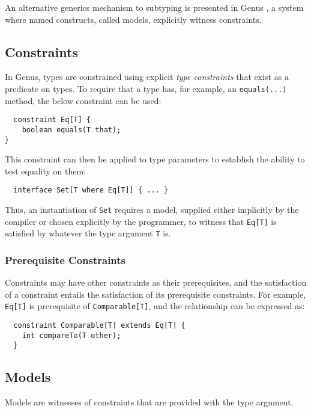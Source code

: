 An alternative generics mechanism to subtyping is presented in Genus \cite{Zhang2015}, a system where named constructs, called models, explicitly witness constraints. 

\subsection{Constraints}

In Genus, types are constrained using explicit \textit{type constraints} that exist as a predicate on types. To require that a type has, for example, an \texttt{equals(...)} method, the below constraint can be used:

\begin{verbatim}
  constraint Eq[T] {
    boolean equals(T that);
}
\end{verbatim}

This constraint can then be applied to type parameters to establish the ability to test equality on them:

\begin{verbatim}
  interface Set[T where Eq[T]] { ... }
\end{verbatim}

Thus, an instantiation of \texttt{Set} requires a model, supplied either implicitly by the compiler or chosen explicitly by the programmer, to witness that \texttt{Eq[T]} is satisfied by whatever the type argument \texttt{T} is.

\subsubsection{Prerequisite Constraints}

Constraints may have other constraints as their prerequisites, and the satisfaction of a constraint entails the satisfaction of its prerequisite constraints. For example, \texttt{Eq[T]} is prerequisite of \texttt{Comparable[T]}, and the relationship can be expressed as:

\begin{verbatim}
  constraint Comparable[T] extends Eq[T] {
    int compareTo(T other);
  }
\end{verbatim}

\subsection{Models}

Models are witnesses of constraints that are provided with the type argument.

